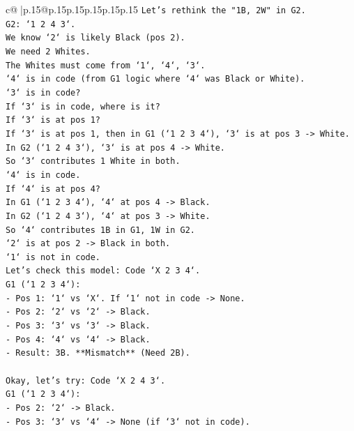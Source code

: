 \documentclass{article}
\begin{document}
{\begin{supertabular}{c@{$\;$}|p{.15\linewidth}@{}p{.15\linewidth}p{.15\linewidth}p{.15\linewidth}p{.15\linewidth}p{.15\linewidth}}
{{{\texttt{Let's rethink the "1B, 2W" in G2.} \\
\texttt{G2: `1 2 4 3`.} \\
\texttt{We know `2` is likely Black (pos 2).} \\
\texttt{We need 2 Whites.} \\
\texttt{The Whites must come from `1`, `4`, `3`.} \\
\texttt{`4` is in code (from G1 logic where `4` was Black or White).} \\
\texttt{`3` is in code?} \\
\texttt{If `3` is in code, where is it?} \\
\texttt{If `3` is at pos 1?} \\
\texttt{If `3` is at pos 1, then in G1 (`1 2 3 4`), `3` is at pos 3 {-}> White.} \\
\texttt{In G2 (`1 2 4 3`), `3` is at pos 4 {-}> White.} \\
\texttt{So `3` contributes 1 White in both.} \\
\texttt{`4` is in code.} \\
\texttt{If `4` is at pos 4?} \\
\texttt{In G1 (`1 2 3 4`), `4` at pos 4 {-}> Black.} \\
\texttt{In G2 (`1 2 4 3`), `4` at pos 3 {-}> White.} \\
\texttt{So `4` contributes 1B in G1, 1W in G2.} \\
\texttt{`2` is at pos 2 {-}> Black in both.} \\
\texttt{`1` is not in code.} \\
\texttt{Let's check this model: Code `X 2 3 4`.} \\
\texttt{G1 (`1 2 3 4`):} \\
\texttt{{-} Pos 1: `1` vs `X`. If `1` not in code {-}> None.} \\
\texttt{{-} Pos 2: `2` vs `2` {-}> Black.} \\
\texttt{{-} Pos 3: `3` vs `3` {-}> Black.} \\
\texttt{{-} Pos 4: `4` vs `4` {-}> Black.} \\
\texttt{{-} Result: 3B. **Mismatch** (Need 2B).} \\
\\ 
\texttt{Okay, let's try: Code `X 2 4 3`.} \\
\texttt{G1 (`1 2 3 4`):} \\
\texttt{{-} Pos 2: `2` {-}> Black.} \\
\texttt{{-} Pos 3: `3` vs `4` {-}> None (if `3` not in code).} \\
}}}
\end{supertabular}}
\end{document}
